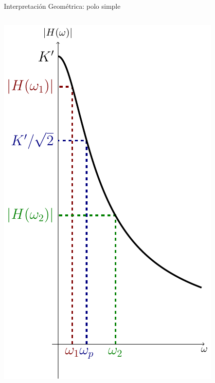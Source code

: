 \documentclass[aspectratio=169, usenames,svgnames,dvipsnames]{beamer}
\begin{document}
\begin{frame}[label={sec:org6d402d1}]{Interpretación Geométrica: polo simple}
\begin{columns}
\begin{column}{0.5\columnwidth}
\begin{center}
\includegraphics[height=0.7\textheight]{../figs/PoloGeometricaPlot.pdf}
\end{center}
\end{column}
\end{columns}
\end{frame}
\end{document}
